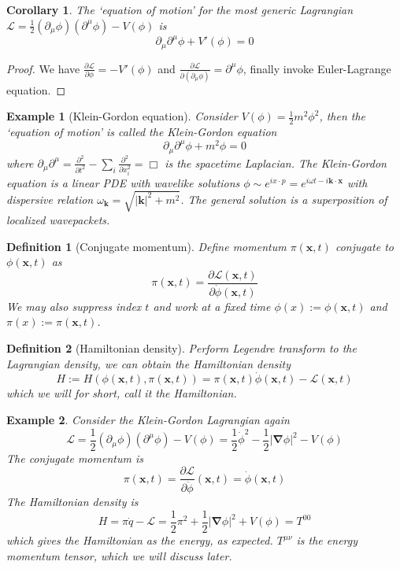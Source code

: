 \documentclass[a4paper]{article}
\newtheorem{eg}{Example}[section]
\theoremstyle{new}
\newtheorem{defi}{Definition}[section]
\newtheorem{cor}{Corollary}[section]
\begin{document}
\begin{cor}
The `equation of motion' for the most generic Lagrangian $\mathcal{L}=\frac{1}{2}(\partial_\mu\phi)(\partial^\mu\phi)-V(\phi)$ is
$$\partial_\mu\partial^\mu\phi+V'(\phi)=0$$
\end{cor}
\begin{proof}
We have $\frac{\partial\mathcal{L}}{\partial\phi}=-V'(\phi)$ and $\frac{\partial\mathcal{L}}{\partial(\partial_\mu\phi)}=\partial^\mu\phi$, finally invoke Euler-Lagrange equation.
\end{proof}
\begin{eg}[Klein-Gordon equation]
Consider $V(\phi)=\frac{1}{2}m^2\phi^2$, then the `equation of motion' is called the Klein-Gordon equation
$$\partial_\mu\partial^\mu\phi+m^2\phi=0$$
where $\partial_\mu\partial^\mu=\frac{\partial^2}{\partial t^2}-\sum_i\frac{\partial^2}{\partial x_i^2}=\Box$ is the spacetime Laplacian. The Klein-Gordon equation is a linear PDE with wavelike solutions $\phi\sim e^{i x\cdot p}=e^{i\omega t-i\mathbf{k}\cdot\mathbf{x}}$ with dispersive relation $\omega_{\mathbf{k}}=\sqrt{|\mathbf{k}|^2+m^2}$. The general solution is a superposition of localized wavepackets.
\end{eg}
\begin{defi}[Conjugate momentum]
Define momentum $\pi(\mathbf{x},t)$ conjugate to $\phi(\mathbf{x},t)$ as
$$\pi(\mathbf{x},t)=\frac{\partial\mathcal{L}(\mathbf{x},t)}{\partial\dot{\phi}(\mathbf{x},t)}$$
We may also suppress index $t$ and work at a fixed time $\phi(x):=\phi(\mathbf{x},t)$ and $\pi(x):=\pi(\mathbf{x},t)$.
\end{defi}
\begin{defi}[Hamiltonian density]
Perform Legendre transform to the Lagrangian density, we can obtain the Hamiltonian density
$$H:=H(\phi(\mathbf{x},t),\pi(\mathbf{x},t))=\pi(\mathbf{x},t)\dot{\phi}(\mathbf{x},t)-\mathcal{L}(\mathbf{x},t)$$
which we will for short, call it the Hamiltonian. 
\end{defi}
\begin{eg}
Consider the Klein-Gordon Lagrangian again
$$\mathcal{L}=\frac{1}{2}(\partial_\mu\phi)(\partial^\mu\phi)-V(\phi)=\frac{1}{2}\dot{\phi}^2-\frac{1}{2}|\boldsymbol{\nabla}\phi|^2-V(\phi)$$
The conjugate momentum is 
$$\pi(\mathbf{x},t)=\frac{\partial\mathcal{L}}{\partial\dot{\phi}}(\mathbf{x},t)=\dot{\phi}(\mathbf{x},t)$$
The Hamiltonian density is
$$H=\pi\dot{q}-\mathcal{L}=\frac{1}{2}\pi^2+\frac{1}{2}|\boldsymbol{\nabla}\phi|^2+V(\phi)=T^{00}$$
which gives the Hamiltonian as the energy, as expected. $T^{\mu\nu}$ is the energy momentum tensor, which we will discuss later.
\end{eg}
\end{document}
